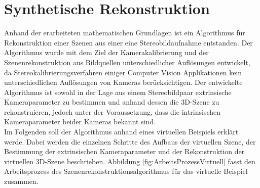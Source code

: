 \chapter{Synthetische Rekonstruktion}
\label{sec:minimal} 

Anhand der erarbeiteten mathematischen Grundlagen ist ein Algorithmus für Rekonstruktion einer Szenen aus einer eine Stereobildaufnahme entstanden. Der Algorithmus wurde mit dem Ziel der Kamerakalibrierung und der Szenenrekonstruktion aus Bildquellen unterschiedlicher Auflösungen entwickelt, da Stereokalibrierungsverfahren einiger Computer Vision Applikationen kein unterschiedlichen Auflösungen von Kameras berücksichtigen.
Der entwickelte Algorithmus ist sowohl in der Lage aus einem Stereobildpaar extrinsische Kameraparameter zu bestimmen und anhand dessen die 3D-Szene zu rekonstruieren, jedoch unter der Voraussetzung, dass die intrinsischen Kameraparameter beider Kameras bekannt sind.\\

Im Folgenden soll der Algorithmus anhand eines virtuellen Beispiels erklärt werde. Dabei werden die einzelnen Schritte des Aufbaus der virtuellen Szene, der Bestimmung der extrinsischen Kameraparameter und der Rekonstruktion der virtuellen 3D-Szene beschrieben. Abbildung \ref{fig:ArbeitsProzessVirtuell} fasst den Arbeitsprozess des Szenenrekonstruktionsalgorithmus für das virtuelle Beispiel zusammen. \\


%
%

